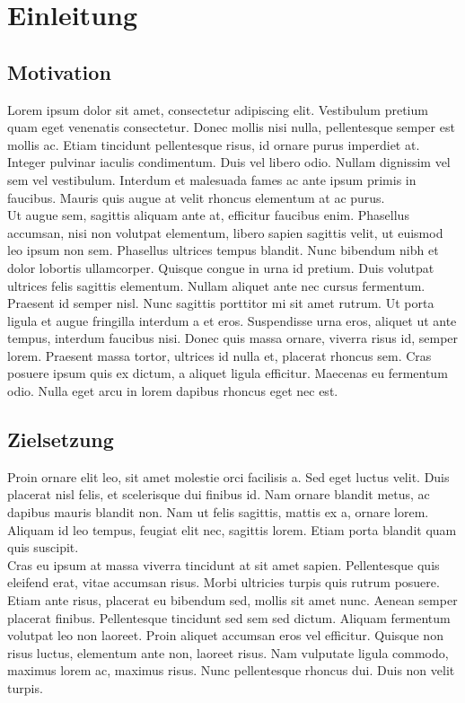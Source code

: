 \section{Einleitung}

\subsection{Motivation}\label{subsec:motivation}

Lorem ipsum dolor sit amet, consectetur adipiscing elit. Vestibulum pretium quam eget venenatis consectetur.
Donec mollis nisi nulla, pellentesque semper est mollis ac.
Etiam tincidunt pellentesque risus, id ornare purus imperdiet at.
Integer pulvinar iaculis condimentum.
Duis vel libero odio.
Nullam dignissim vel sem vel vestibulum.
Interdum et malesuada fames ac ante ipsum primis in faucibus.
Mauris quis augue at velit rhoncus elementum at ac purus.\\
Ut augue sem, sagittis aliquam ante at, efficitur faucibus enim.
Phasellus accumsan, nisi non volutpat elementum, libero sapien sagittis velit, ut euismod leo ipsum non sem.
Phasellus ultrices tempus blandit.
Nunc bibendum nibh et dolor lobortis ullamcorper.
Quisque congue in urna id pretium.
Duis volutpat ultrices felis sagittis elementum.
Nullam aliquet ante nec cursus fermentum.
Praesent id semper nisl.
Nunc sagittis porttitor mi sit amet rutrum.
Ut porta ligula et augue fringilla interdum a et eros.
Suspendisse urna eros, aliquet ut ante tempus, interdum faucibus nisi.
Donec quis massa ornare, viverra risus id, semper lorem.
Praesent massa tortor, ultrices id nulla et, placerat rhoncus sem.
Cras posuere ipsum quis ex dictum, a aliquet ligula efficitur.
Maecenas eu fermentum odio.
Nulla eget arcu in lorem dapibus rhoncus eget nec est.

\subsection{Zielsetzung}

Proin ornare elit leo, sit amet molestie orci facilisis a.
Sed eget luctus velit.
Duis placerat nisl felis, et scelerisque dui finibus id.
Nam ornare blandit metus, ac dapibus mauris blandit non.
Nam ut felis sagittis, mattis ex a, ornare lorem.
Aliquam id leo tempus, feugiat elit nec, sagittis lorem.
Etiam porta blandit quam quis suscipit.\\
Cras eu ipsum at massa viverra tincidunt at sit amet sapien.
Pellentesque quis eleifend erat, vitae accumsan risus.
Morbi ultricies turpis quis rutrum posuere.
Etiam ante risus, placerat eu bibendum sed, mollis sit amet nunc.
Aenean semper placerat finibus.
Pellentesque tincidunt sed sem sed dictum.
Aliquam fermentum volutpat leo non laoreet.
Proin aliquet accumsan eros vel efficitur.
Quisque non risus luctus, elementum ante non, laoreet risus.
Nam vulputate ligula commodo, maximus lorem ac, maximus risus.
Nunc pellentesque rhoncus dui. Duis non velit turpis.

